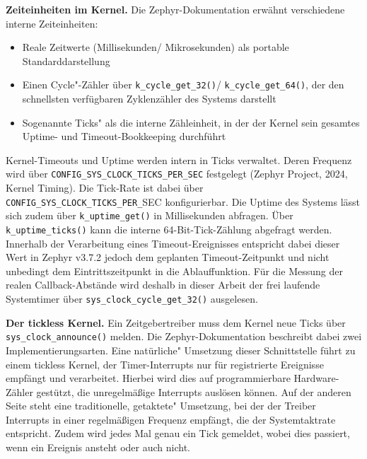 \textbf{Zeiteinheiten im Kernel.} Die Zephyr-Dokumentation erw{\"a}hnt verschiedene interne Zeiteinheiten:

\begin{itemize}
\item Reale Zeitwerte (Millisekunden/ Mikrosekunden) als portable Standarddarstellung
\item Einen \glqq{}Cycle"-Z{\"a}hler {\"u}ber \lstinline[style=codeinline]|k_cycle_get_32()|/ \lstinline[style=codeinline]|k_cycle_get_64()|, der den schnellsten verf{\"u}gbaren Zyklenz{\"a}hler des Systems darstellt
\item Sogenannte \glqq{}Ticks" als die interne Z{\"a}hleinheit, in der der Kernel sein gesamtes Uptime- und Timeout-Bookkeeping durchf{\"u}hrt
\end{itemize}
Kernel-Timeouts und Uptime werden intern in Ticks verwaltet. Deren Frequenz wird {\"u}ber \lstinline[style=codeinline]|CONFIG_SYS_CLOCK_TICKS_PER_SEC| festgelegt (Zephyr Project, 2024, \glqq{}Kernel Timing\grqq{}). Die Tick-Rate ist dabei {\"u}ber \lstinline[style=codeinline]|CONFIG_SYS_CLOCK_TICKS_PER_|SEC konfigurierbar. Die Uptime des Systems l{\"a}sst sich zudem {\"u}ber \lstinline[style=codeinline]|k_uptime_get()| in Millisekunden abfragen. {\"U}ber \lstinline[style=codeinline]|k_uptime_ticks()| kann die interne 64-Bit-Tick-Z{\"a}hlung abgefragt werden. Innerhalb der Verarbeitung eines Timeout-Ereignisses entspricht dabei dieser Wert in Zephyr v3.7.2 jedoch dem geplanten Timeout-Zeitpunkt und nicht unbedingt dem Eintrittszeitpunkt in die Ablauffunktion. F{\"u}r die Messung der realen Callback-Abst{\"a}nde wird deshalb in dieser Arbeit der frei laufende Systemtimer {\"u}ber \lstinline[style=codeinline]|sys_clock_cycle_get_32()| ausgelesen.

\textbf{Der tickless Kernel.} Ein Zeitgebertreiber muss dem Kernel neue Ticks {\"u}ber \lstinline[style=codeinline]|sys_clock_announce()| melden. Die Zephyr-Dokumentation beschreibt dabei zwei Implementierungsarten. Eine \glqq{}nat{\"u}rliche" Umsetzung dieser Schnittstelle f{\"u}hrt zu einem \glqq{}tickless\grqq{} Kernel, der Timer-Interrupts nur f{\"u}r registrierte Ereignisse empf{\"a}ngt und verarbeitet. Hierbei wird dies auf programmierbare Hardware-Z{\"a}hler gest{\"u}tzt, die unregelm{\"a}{\ss}ige Interrupts ausl{\"o}sen k{\"o}nnen. Auf der anderen Seite steht eine traditionelle, \glqq{}getaktete" Umsetzung, bei der der Treiber Interrupts in einer regelm{\"a}{\ss}igen Frequenz empf{\"a}ngt, die der Systemtaktrate entspricht. Zudem wird jedes Mal genau ein Tick gemeldet, wobei dies passiert, wenn ein Ereignis ansteht oder auch nicht.


